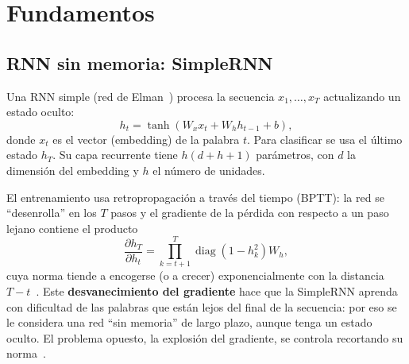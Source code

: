 \documentclass[12pt, a4paper]{article}
\newcommand{\tabla}[1]{}
\newcommand{\tablaancha}[1]{\adjustbox{max width=\linewidth}{\tabla{#1}}}
\begin{document}
\begin{table}[H]
\centering
\caption{Longitud de los documentos en tokens por partición y documentos vacíos tras la limpieza.}
\label{tab:eda_longitudes}
\small
\tablaancha{eda_longitudes}
\end{table}

\begin{table}[H]
\centering
\begin{minipage}{0.46\linewidth}
\centering
\caption{Documentos de entrenamiento que caben completos según $L$.}
\label{tab:eda_L}
\small
\tabla{eda_L}
\end{minipage}\hfill
\begin{minipage}{0.5\linewidth}
\centering
\caption{Cobertura del vocabulario en validación según $V$.}
\label{tab:eda_V}
\small
\resizebox{\linewidth}{!}{\tabla{eda_V}}
\end{minipage}
\end{table}

\section{Fundamentos}\label{sec:fundamentos}

\subsection{RNN sin memoria: SimpleRNN}

Una RNN simple (red de Elman~\cite{elman1990}) procesa la secuencia $x_1, \dots, x_T$ actualizando un estado oculto:
\begin{equation}
    h_t = \tanh\left(W_x x_t + W_h h_{t-1} + b\right),
\end{equation}
donde $x_t$ es el vector (embedding) de la palabra $t$. Para clasificar se usa el último estado $h_T$. Su capa recurrente tiene $h(d+h+1)$ parámetros, con $d$ la dimensión del embedding y $h$ el número de unidades.

El entrenamiento usa retropropagación a través del tiempo (BPTT): la red se ``desenrolla'' en los $T$ pasos y el gradiente de la pérdida con respecto a un paso lejano contiene el producto
\begin{equation}
    \frac{\partial h_T}{\partial h_t} = \prod_{k=t+1}^{T} \operatorname{diag}\left(1 - h_k^2\right) W_h ,
\end{equation}
cuya norma tiende a encogerse (o a crecer) exponencialmente con la distancia $T-t$~\cite{bengio1994,pascanu2013}. Este \textbf{desvanecimiento del gradiente} hace que la SimpleRNN aprenda con dificultad de las palabras que están lejos del final de la secuencia: por eso se le considera una red ``sin memoria'' de largo plazo, aunque tenga un estado oculto. El problema opuesto, la explosión del gradiente, se controla recortando su norma~\cite{pascanu2013}.
\end{document}
